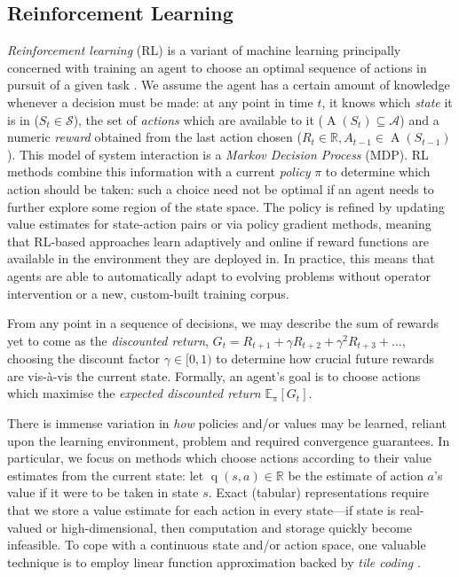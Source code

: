 \documentclass[10pt, times, comsoc]{IEEEtran}
\begin{document}
\subsection{Reinforcement Learning}\label{sec:reinforcement-learning}
\emph{Reinforcement learning} (RL) is a variant of machine learning principally concerned with training an agent to choose an optimal sequence of actions in pursuit of a given task \cite{RL2E}.
We assume the agent has a certain amount of knowledge whenever a decision must be made: at any point in time $t$, it knows which \emph{state} it is in ($S_t \in \mathcal{S}$), the set of \emph{actions} which are available to it ($\operatorname{A}(S_t) \subseteq \mathcal{A}$) and a numeric \emph{reward} obtained from the last action chosen ($R_t \in \mathbb{R}, A_{t-1} \in \operatorname{A}(S_{t-1})$).
This model of system interaction is a \emph{Markov Decision Process} (MDP).
RL methods combine this information with a current \emph{policy} $\pi$ to determine which action should be taken: such a choice need not be optimal if an agent needs to further explore some region of the state space.
The policy is refined by updating value estimates for state-action pairs or via policy gradient methods, meaning that RL-based approaches learn adaptively and online if reward functions are available in the environment they are deployed in.
In practice, this means that agents are able to automatically adapt to evolving problems without operator intervention or a new, custom-built training corpus.

From any point in a sequence of decisions, we may describe the sum of rewards yet to come as the \emph{discounted return}, $G_t = R_{t+1} + \gamma R_{t+2} + \gamma^2 R_{t+3} + \ldots$, choosing the discount factor $\gamma \in [0,1)$ to determine how crucial future rewards are vis-\`{a}-vis the current state.
Formally, an agent's goal is to choose actions which maximise the \emph{expected discounted return} $\operatorname{\mathbb{E}_{\pi}}[G_t]$.


There is immense variation in \emph{how} policies and/or values may be learned, reliant upon the learning environment, problem and required convergence guarantees.
In particular, we focus on methods which choose actions according to their value estimates from the current state: let $\operatorname{q}(s, a) \in \mathbb{R}$ be the estimate of action $a$'s value if it were to be taken in state $s$.
Exact (tabular) representations require that we store a value estimate for each action in every state---if state is real-valued or high-dimensional, then computation and storage quickly become infeasible.
To cope with a continuous state and/or action space, one valuable technique is to employ linear function approximation backed by \emph{tile coding} \cite[pp.\ \numrange{217}{221}]{RL2E}.
\end{document}
